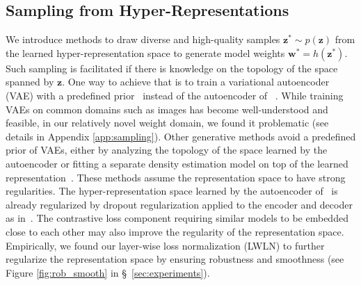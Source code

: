 \documentclass{article}
\begin{document}
\subsection{Sampling from Hyper-Representations}
\label{sec:sampling}
We introduce methods to draw diverse and high-quality samples $\mathbf{z}^* \sim p(\mathbf{z})$ from the learned hyper-representation space to generate model weights $\mathbf{w}^* = h(\mathbf{z}^*)$. 
Such sampling is facilitated if there is knowledge on the topology of the space spanned by $\mathbf{z}$. One way to achieve that is to train a variational autoencoder (VAE) with a predefined prior~\citep{kingmaAutoEncodingVariationalBayes2013} instead of the autoencoder of ~\citep{schurholtSelfSupervisedRepresentationLearning2021}. 
While training VAEs on common domains such as images has become well-understood and feasible, in our relatively novel weight domain, we found it problematic (see details in Appendix \ref{app:sampling}).
Other generative methods avoid a predefined prior of VAEs, either by analyzing the topology of the space learned by the autoencoder or fitting a separate density estimation model on top of the learned representation~\citep{liu2019acceleration,guo2019auto}. These methods assume the representation space to have strong regularities.
The hyper-representation space learned by the autoencoder of~\citep{schurholtSelfSupervisedRepresentationLearning2021} is already regularized by dropout regularization applied to the encoder and decoder as in~\citep{ghoshVariationalDeterministicAutoencoders2020}. The contrastive loss component requiring similar models to be embedded close to each other may also improve the regularity of the representation space.
Empirically, we found our layer-wise loss normalization (LWLN) to further regularize the representation space by ensuring robustness and smoothness (see Figure \ref{fig:rob_smooth} in \S~\ref{sec:experiments}). 
\end{document}
